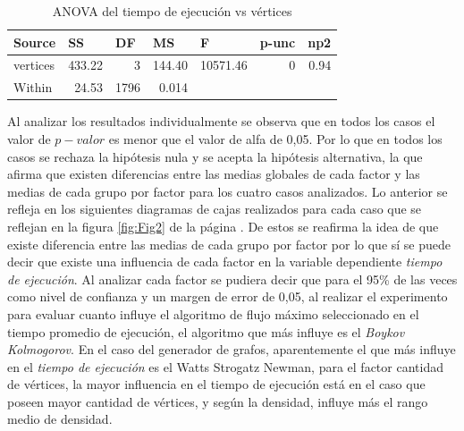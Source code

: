 \documentclass{article}
\begin{document}
\begin{table}[htbp]
  \centering
  \caption{ANOVA del tiempo de ejecución vs vértices}
    \begin{tabular}{lrrrlll}
    \toprule
    \textbf{Source} & \multicolumn{1}{l}{\textbf{SS}} & \multicolumn{1}{l}{\textbf{DF}} & \multicolumn{1}{l}{\textbf{MS}} & \textbf{F} & \textbf{p-unc} & \textbf{np2} \\
    \midrule
    vertices & 433.22 & 3     & 144.40 & \multicolumn{1}{r}{10571.46} & \multicolumn{1}{r}{0} & \multicolumn{1}{r}{0.94} \\
    Within & 24.53 & 1796  & 0.014 &     &      &  \\
    \bottomrule
    \end{tabular}%
  \label{tab:addlabel}%
\end{table}%
\newpage

Al analizar los resultados individualmente se observa que en todos los casos el valor de $p-valor$ es menor que el valor de alfa de 0,05. Por lo que en todos los casos se rechaza la hipótesis nula y se acepta la hipótesis alternativa, la que afirma que existen diferencias entre las medias globales de cada factor y las medias de cada grupo por factor para los cuatro casos analizados. Lo anterior se refleja en los siguientes diagramas de cajas realizados para cada caso que se reflejan en la figura \ref{fig:Fig2} de la página \pageref{fig:Fig2}.
De estos se reafirma la idea de que existe diferencia entre las medias de cada grupo por factor por lo que sí se puede decir que existe una influencia de cada factor en la variable dependiente \textit{tiempo de ejecución}. Al analizar cada factor se pudiera decir que para el 95\% de las veces como nivel de confianza y un margen de error de 0,05, al realizar el experimento para evaluar cuanto influye el algoritmo de flujo máximo seleccionado en el tiempo promedio de ejecución, el algoritmo que más influye es el \textit{Boykov Kolmogorov}. En el caso del generador de grafos, aparentemente el que más influye en el \textit{tiempo de ejecución} es el Watts Strogatz Newman, para el factor cantidad de vértices, la mayor influencia en el tiempo de ejecución está en el caso que poseen mayor cantidad de vértices, y según la densidad, influye más el rango medio de densidad. 
\end{document}
